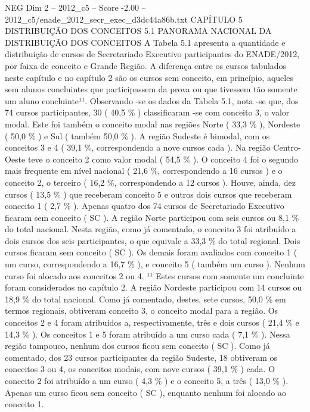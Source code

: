 \begin{textsample}{NEG Dim 2 – 2012\_c5 – Score -2.00 – 2012\_c5/enade\_2012\_secr\_exec\_d3dc44a86b.txt}  \label{ex:f2_neg_078}
CAPÍTULO 5 DISTRIBUIÇÃO DOS CONCEITOS 5.1 PANORAMA NACIONAL DA DISTRIBUIÇÃO DOS CONCEITOS A Tabela 5.1 apresenta a quantidade e distribuição de cursos de Secretariado Executivo participantes do ENADE/2012, por faixa de conceito e Grande Região.
A diferença entre os cursos tabulados neste capítulo e no capítulo 2 são os cursos sem conceito, em princípio, aqueles sem alunos concluintes que participassem da prova ou que tivessem tão somente um aluno concluinte¹¹.
Observando -se os dados da Tabela 5.1, nota -se que, dos 74 cursos participantes, 30 ( 40,5 \% ) classificaram -se com conceito 3, o valor modal.
Este foi também o conceito modal nas regiões Norte ( 33,3 \% ), Nordeste ( 50,0 \% ) e Sul ( também 50,0 \% ).
A região Sudeste é bimodal, com os conceitos 3 e 4 ( 39,1 \%, correspondendo a nove cursos cada ).
Na região Centro-Oeste teve o conceito 2 como valor modal ( 54,5 \% ).
O conceito 4 foi o segundo mais frequente em nível nacional ( 21,6 \%, correspondendo a 16 cursos ) e o conceito 2, o terceiro ( 16,2 \%, correspondendo a 12 cursos ).
Houve, ainda, dez cursos ( 13,5 \% ) que receberam conceito 5 e outros dois cursos que receberam conceito 1 ( 2,7 \% ).
Apenas quatro dos 74 cursos de Secretariado Executivo ficaram sem conceito ( SC ).
A região Norte participou com seis cursos ou 8,1 \% do total nacional.
Nesta região, como já comentado, o conceito 3 foi atribuído a dois cursos dos seis participantes, o que equivale a 33,3 \% do total regional.
Dois cursos ficaram sem conceito ( SC ).
Os demais foram avaliados com conceito 1 ( um curso, correspondendo a 16,7 \% ), e conceito 5 ( também um curso ).
Nenhum curso foi alocado aos conceitos 2 ou 4. ¹¹ Estes cursos com somente um concluinte foram considerados no capítulo 2.
A região Nordeste participou com 14 cursos ou 18,9 \% do total nacional.
Como já comentado, destes, sete cursos, 50,0 \% em termos regionais, obtiveram conceito 3, o conceito modal para a região.
Os conceitos 2 e 4 foram atribuídos a, respectivamente, três e dois cursos ( 21,4 \% e 14,3 \% ).
Os conceitos 1 e 5 foram atribuído a um curso cada ( 7,1 \% ).
Nessa região tampouco, nenhum dos cursos ficou sem conceito ( SC ).
Como já comentado, dos 23 cursos participantes da região Sudeste, 18 obtiveram os conceitos 3 ou 4, os conceitos modais, com nove cursos ( 39,1 \% ) cada.
O conceito 2 foi atribuído a um curso ( 4,3 \% ) e o conceito 5, a três ( 13,0 \% ).
Apenas um curso ficou sem conceito ( SC ), enquanto nenhum foi alocado ao conceito 1.

\end{textsample}
